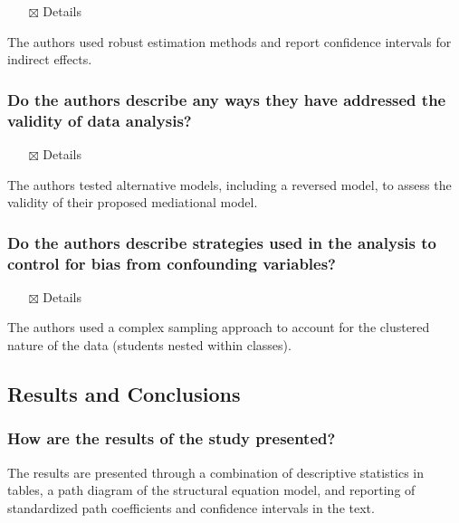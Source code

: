 \documentclass[
  doc, a4paper]{apa7}
\providecommand{\tightlist}{%
  \setlength{\itemsep}{0pt}\setlength{\parskip}{0pt}}
\begin{document}
\begin{itemize}
\tightlist
\item[$\boxtimes$]
  Details
\end{itemize}

The authors used robust estimation methods and report confidence intervals for indirect effects.

\subsubsection{Do the authors describe any ways they have addressed the validity of data analysis?}\label{do-the-authors-describe-any-ways-they-have-addressed-the-validity-of-data-analysis}

\begin{itemize}
\tightlist
\item[$\boxtimes$]
  Details
\end{itemize}

The authors tested alternative models, including a reversed model, to assess the validity of their proposed mediational model.

\subsubsection{Do the authors describe strategies used in the analysis to control for bias from confounding variables?}\label{do-the-authors-describe-strategies-used-in-the-analysis-to-control-for-bias-from-confounding-variables}

\begin{itemize}
\tightlist
\item[$\boxtimes$]
  Details
\end{itemize}

The authors used a complex sampling approach to account for the clustered nature of the data (students nested within classes).

\subsection{Results and Conclusions}\label{results-and-conclusions}

\subsubsection{How are the results of the study presented?}\label{how-are-the-results-of-the-study-presented}

The results are presented through a combination of descriptive statistics in tables, a path diagram of the structural equation model, and reporting of standardized path coefficients and confidence intervals in the text.
\end{document}
